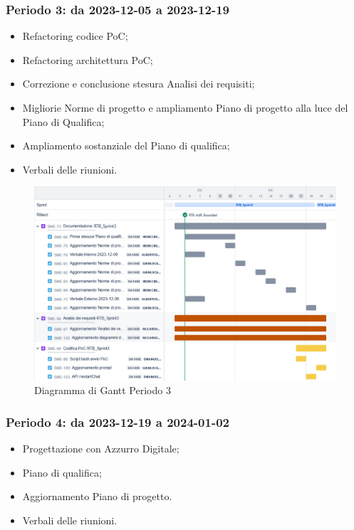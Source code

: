 \documentclass[10pt, a4paper]{article}
\begin{document}
{{{{{{{{\subsubsection{Periodo 3: da 2023-12-05 a 2023-12-19}
\begin{itemize}
    \item Refactoring codice PoC;
    \item Refactoring architettura PoC;
    \item Correzione e conclusione stesura Analisi dei requisiti;
    \item Migliorie Norme di progetto e ampliamento Piano di progetto alla luce del Piano di Qualifica;
    \item Ampliamento sostanziale del Piano di qualifica;
    \item Verbali delle riunioni.
\end{itemize}
\begin{figure}[H]
    \centering        
    \includegraphics[width=15.5cm]{ganttPeriodo3.png}
    \caption{Diagramma di Gantt Periodo 3 }
\end{figure}

\subsubsection{Periodo 4: da 2023-12-19 a 2024-01-02}
\begin{itemize}
    \item Progettazione con Azzurro Digitale;
    \item Piano di qualifica;
    \item Aggiornamento Piano di progetto.
    \item Verbali delle riunioni.
\end{itemize}
}}}}}}}}
\end{document}
